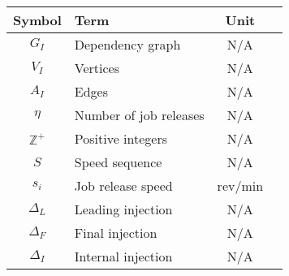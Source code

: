 \begin{center}
\bgroup
\begin{tabular}{| c | l | c | c |}
    \hline
    Symbol & Term & Unit \\  \hline \hline \cline{1-3}
    $G_I$ & Dependency graph & N/A \\ \cline{1-3}
    $V_I$ & Vertices & N/A \\ \cline{1-3}
    $A_I$ & Edges & N/A \\ \cline{1-3}
    $\eta$ & Number of job releases & N/A \\ \cline{1-3}
    $\mathbb{Z}^+$ & Positive integers & N/A \\ \cline{1-3}
    $S$ & Speed sequence & N/A \\ \cline{1-3}
    $s_i$ & Job release speed & rev/min \\ \cline{1-3}
    $\Delta_L$ & Leading injection & N/A \\ \cline{1-3}
    $\Delta_F$ & Final injection & N/A \\ \cline{1-3}
    $\Delta_I$ & Internal injection & N/A \\ \cline{1-3}
\end{tabular}
\egroup
\end{center}